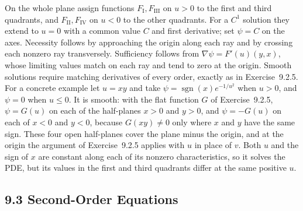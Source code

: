 On the whole plane assign functions $F_{\mathrm I},F_{\mathrm{III}}$
on $u>0$ to the first and third quadrants, and
$F_{\mathrm{II}},F_{\mathrm{IV}}$ on $u<0$ to the other quadrants.
For a $C^1$ solution they extend to $u=0$ with a common value $C$
and first derivative; set $\psi=C$ on the axes.
Necessity follows by approaching the origin along each ray and by
crossing each nonzero ray transversely.  Sufficiency follows from
$\nabla\psi=F'(u)(y,x)$, whose limiting values match on each ray and
tend to zero at the origin.  Smooth solutions require matching derivatives
of every order, exactly as in Exercise~9.2.5.
For a concrete example let $u=xy$ and take
$\psi=\operatorname{sgn}(x)e^{-1/u^2}$ when $u>0$, and $\psi=0$
when $u\le0$.  It is smooth: with the flat function $G$ of
Exercise~9.2.5, $\psi=G(u)$ on each of the half-planes $x>0$ and $y>0$,
and $\psi=-G(u)$ on each of $x<0$ and $y<0$, because $G(xy)\ne0$ only
where $x$ and $y$ have the same sign.  These four open half-planes cover
the plane minus the origin, and at the origin the argument of
Exercise~9.2.5 applies with $u$ in place of $v$.
Both $u$ and the sign of $x$ are constant along each of its nonzero
characteristics, so it solves the PDE, but its values in the first and
third quadrants differ at the same positive $u$.


\subsection*{9.3 Second-Order Equations}

